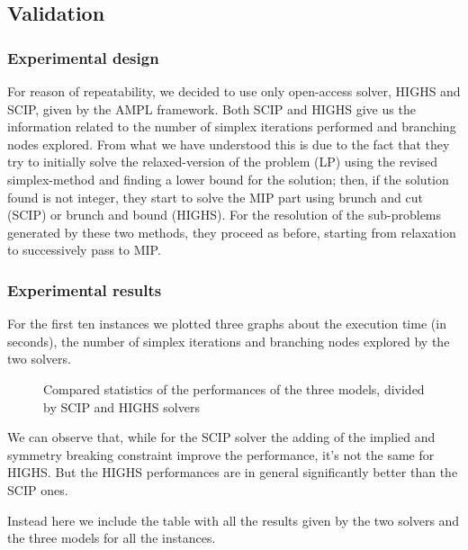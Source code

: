 \subsection{Validation}

\subsubsection{Experimental design}
For reason of repeatability, we decided to use only open-access solver, HIGHS and SCIP, given by the AMPL framework.
Both SCIP and HIGHS give us the information related to the number of simplex iterations performed and branching nodes explored. From what we have understood this is due to the fact that they try to initially solve the relaxed-version of the problem (LP) using the revised simplex-method and finding a lower bound for the solution; then, if the solution found is not integer, they start to solve the MIP part using brunch and cut (SCIP) or brunch and bound (HIGHS). For the resolution of the sub-problems generated by these two methods, they proceed as before, starting from relaxation to successively pass to MIP.

\subsubsection{Experimental results}

For the first ten instances we plotted three graphs about the execution time (in seconds), the number of simplex iterations and branching nodes explored by the two solvers.
\newpage
\begin{figure}[!h]
    \centering
    \hfill
    \hfill
    \caption{Compared statistics of the performances of the three models, divided by SCIP and HIGHS solvers}
\end{figure}

We can observe that, while for the SCIP solver the adding of the implied and symmetry breaking constraint improve the performance, it's not the same for HIGHS.
But the HIGHS performances are in general significantly better than the SCIP ones.


Instead here we include the table with all the results given by the two solvers and the three models for all the instances.

